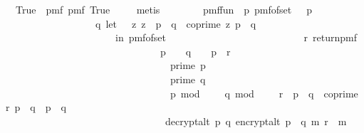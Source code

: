 \begin{isabellebody}
\ \ True\ {\isacharequal}{\kern0pt}\ pmf\ {\isacharquery}{\kern0pt}pmf\ True{\isachardoublequoteclose}\ \isanewline
\ \ \isamarkupfalse%
\ metis\isanewline
\ \isanewline
\ \ \isanewline
\ \ \isamarkupfalse%
\ {\isacharquery}{\kern0pt}pmf{\isacharunderscore}{\kern0pt}fun\ {\isacharequal}{\kern0pt}\ {\isachardoublequoteopen}{\isacharparenleft}{\kern0pt}{\isasymlambda}p{\isachardot}{\kern0pt}\ pmf{\isacharunderscore}{\kern0pt}of{\isacharunderscore}{\kern0pt}set\ {\isacharparenleft}{\kern0pt}{\isacharquery}{\kern0pt}{\isasymK}\ {\isacharminus}{\kern0pt}\ {\isacharbraceleft}{\kern0pt}p{\isacharbraceright}{\kern0pt}{\isacharparenright}{\kern0pt}\ {\isasymbind}\isanewline
\ \ \ \ \ \ \ \ \ \ \ \ \ \ \ \ \ \ {\isacharparenleft}{\kern0pt}{\isasymlambda}q{\isachardot}{\kern0pt}\ let\ {\isasymZ}\ {\isacharequal}{\kern0pt}\ {\isacharbraceleft}{\kern0pt}z{\isachardot}{\kern0pt}\ z\ {\isacharless}{\kern0pt}\ p\ {\isacharasterisk}{\kern0pt}\ q\ {\isasymand}\ coprime\ z\ {\isacharparenleft}{\kern0pt}p\ {\isacharasterisk}{\kern0pt}\ q{\isacharparenright}{\kern0pt}{\isacharbraceright}{\kern0pt}\isanewline
\ \ \ \ \ \ \ \ \ \ \ \ \ \ \ \ \ \ \ \ \ \ in\ pmf{\isacharunderscore}{\kern0pt}of{\isacharunderscore}{\kern0pt}set\ {\isasymZ}\ {\isasymbind}\isanewline
\ \ \ \ \ \ \ \ \ \ \ \ \ \ \ \ \ \ \ \ \ \ \ \ \ {\isacharparenleft}{\kern0pt}{\isasymlambda}r{\isachardot}{\kern0pt}\ return{\isacharunderscore}{\kern0pt}pmf\isanewline
\ \ \ \ \ \ \ \ \ \ \ \ \ \ \ \ \ \ \ \ \ \ \ \ \ \ \ \ \ \ \ {\isacharparenleft}{\kern0pt}{\isacharparenleft}{\kern0pt}p\ {\isasymin}\ {\isacharquery}{\kern0pt}{\isasymK}\ {\isasymand}\ q\ {\isasymin}\ {\isacharquery}{\kern0pt}{\isasymK}\ {\isacharminus}{\kern0pt}\ {\isacharbraceleft}{\kern0pt}p{\isacharbraceright}{\kern0pt}\ {\isasymand}\ r\ {\isasymin}\ {\isasymZ}\ {\isasymor}\isanewline
\ \ \ \ \ \ \ \ \ \ \ \ \ \ \ \ \ \ \ \ \ \ \ \ \ \ \ \ \ \ \ \ \ prime\ p\ {\isasymand}\isanewline
\ \ \ \ \ \ \ \ \ \ \ \ \ \ \ \ \ \ \ \ \ \ \ \ \ \ \ \ \ \ \ \ \ prime\ q\ {\isasymand}\isanewline
\ \ \ \ \ \ \ \ \ \ \ \ \ \ \ \ \ \ \ \ \ \ \ \ \ \ \ \ \ \ \ \ \ p\ mod\ {}\ {\isacharequal}{\kern0pt}\ {}\ {\isasymand}\ q\ mod\ {}\ {\isacharequal}{\kern0pt}\ {}\ {\isasymand}\ r\ {\isacharless}{\kern0pt}\ p\ {\isacharasterisk}{\kern0pt}\ q\ {\isasymand}\ coprime\ r\ {\isacharparenleft}{\kern0pt}p\ {\isacharasterisk}{\kern0pt}\ q{\isacharparenright}{\kern0pt}\ {\isasymand}\ p\ {\isasymnoteq}\ q{\isacharparenright}{\kern0pt}\ {\isasymor}\isanewline
\ \ \ \ \ \ \ \ \ \ \ \ \ \ \ \ \ \ \ \ \ \ \ \ \ \ \ \ \ \ \ \ decrypt{\isacharunderscore}{\kern0pt}alt\ p\ q\ {\isacharparenleft}{\kern0pt}encrypt{\isacharunderscore}{\kern0pt}alt\ {\isacharparenleft}{\kern0pt}p\ {\isacharasterisk}{\kern0pt}\ q{\isacharparenright}{\kern0pt}\ m\ r{\isacharparenright}{\kern0pt}\ {\isacharequal}{\kern0pt}\ m{\isacharparenright}{\kern0pt}{\isacharparenright}{\kern0pt}{\isacharparenright}{\kern0pt}{\isacharparenright}{\kern0pt}{\isachardoublequoteclose}\isanewline

\end{isabellebody}
